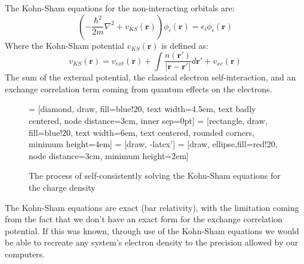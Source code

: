 \documentclass[12pt]{article}
\begin{document}
The Kohn-Sham equations for the non-interacting orbitals are:
\begin{equation}\label{eq:kohn-sham}
\left(-\frac{\hbar^2}{2m}\nabla^2 + v_{KS}(\mathbf r)\right)\phi_i(\mathbf r) = \epsilon_i \phi_i(\mathbf r)
\end{equation}
Where the Kohn-Sham potential $v_{KS}(\mathbf r)$ is defined as:
\begin{equation}\label{eq:kohn-shampotential}
v_{KS}(\mathbf r) = v_{ext}(\mathbf r) + \int \frac{n(\mathbf r')}{\left|\mathbf r - \mathbf {r'}\right|}d\mathbf {r'} + v_{xc}(\mathbf r)
\end{equation}
The sum of the external potential, the classical electron self-interaction, and an exchange correlation term coming from quantum effects on the electrons. 
\begin{figure}
\centering
	 = [diamond, draw, fill=blue!20, 
    text width=4.5em, text badly centered, node distance=3cm, inner sep=0pt]
 = [rectangle, draw, fill=blue!20, 
    text width=6em, text centered, rounded corners, minimum height=4em]
 = [draw, -latex']
 = [draw, ellipse,fill=red!20, node distance=3cm,
    minimum height=2em]
    
\caption{The process of self-consistently solving the Kohn-Sham equations for the charge density}
\end{figure}

The Kohn-Sham equations are exact (bar relativity), with the limitation coming from the fact that we don't have an exact form for the exchange correlation potential. 
If this was known, through use of the Kohn-Sham equations we would be able to recreate any system's electron density to the precision allowed by our computers.
\end{document}
